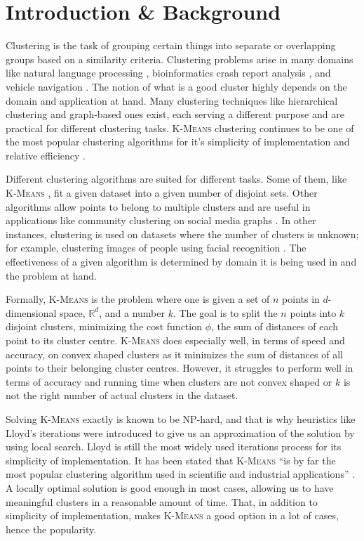 \documentclass[12pt]{dalthesis}
\newcommand*{\kmeans}{\textsc{K-Means} } %
\begin{document}
\mainmatter

\chapter{Introduction \& Background}
Clustering is the task of grouping certain things into separate or overlapping groups based on a similarity criteria. Clustering problems arise in many domains like
natural language processing \citep{ravichandran2005randomized},
bioinformatics \citep{edgar2010search}
crash report analysis \citep{soto2016machine}, 
and vehicle navigation \citep{maio1996dynamic}.
The notion of what is a good cluster highly depends on the domain and application at hand. Many clustering techniques like hierarchical clustering \citep{corpet1988multiple}
and graph-based ones \citep{schaeffer2007graph}
exist, each serving a different purpose and are practical for different clustering tasks. \kmeans clustering continues to be one of the most popular clustering algorithms for it's simplicity of implementation and relative efficiency \citep{jain2010data}.

Different clustering algorithms are suited for different tasks. Some of them, like \kmeans, fit a given dataset into a given number of disjoint sets. Other algorithms allow points to belong to multiple clusters and are useful in applications like community clustering on social media graphs \citep{epasto2017ego}. In other instances, clustering is used on datasets where the number of clusters is unknown; for example, clustering images of people using facial recognition \citep{schroff2015facenet}. The effectiveness of a given algorithm is determined by domain it is being used in and the problem at hand.

Formally, \kmeans is the problem where one is given a set of $n$ points in $d$-dimensional space, $\mathbb{R}^d$, and a number $k$. The goal is to split the $n$ points into $k$ disjoint clusters, minimizing the cost function $\phi$, the sum of distances of each point to its cluster centre. \kmeans does especially well, in terms of speed and accuracy, on convex shaped clusters as it minimizes the sum of distances of all points to their belonging cluster centres. However, it struggles to perform well in terms of accuracy and running time when clusters are not convex shaped or $k$ is not the right number of actual clusters in the dataset.

Solving \kmeans exactly is known to be NP-hard, and that is why heuristics like Lloyd's \citep{1056489} iterations were introduced to give us an approximation of the solution by using local search. Lloyd is still the most widely used iterations process for its simplicity of implementation. It has been stated that \kmeans ``is by far the most popular clustering algorithm used in scientific and industrial applications'' \citep{clusteringservey}. A locally optimal solution is good enough in most cases, allowing us to have meaningful clusters in a reasonable amount of time. That, in addition to simplicity of implementation, makes \kmeans a good option in a lot of cases, hence the popularity.
\end{document}
